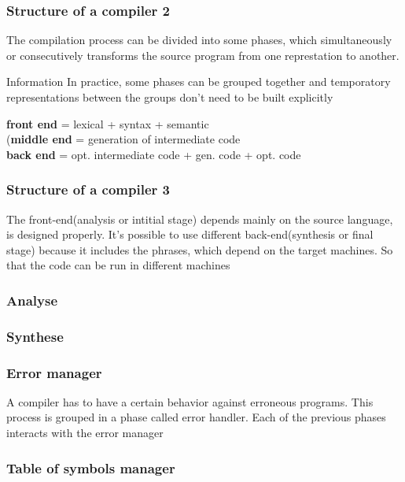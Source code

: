 \documentclass{beamer}
\begin{document}
\begin{frame}
\frametitle{Structure of a compiler 2}
The compilation process can be divided into some phases, which simultaneously or consecutively transforms the source program from one represtation to another.
\begin{block}{Information}
In practice, some phases can be grouped together and temporatory representations between the groups don't need to be built explicitly
\end{block}
\textbf{front end }= lexical + syntax + semantic\\
(\textbf{middle end} = generation of intermediate code\\
\textbf{back end} = opt. intermediate code + gen. code + opt. code\\
\end{frame}


\begin{frame}
\frametitle{Structure of a compiler 3}
The front-end(analysis or intitial stage) depends mainly on the source language, is designed properly. It's possible to use different back-end(synthesis or final stage) because it includes the phrases, which depend on the target machines. So that the code can be run in different machines
\end{frame}


\begin{frame}
\frametitle{Analyse}
\end{frame}
\begin{frame}
\frametitle{Synthese}
\end{frame}
\begin{frame}
\frametitle{Error manager}
A compiler has to have a certain behavior against erroneous programs. This process is grouped in a phase called error handler. Each of the previous phases interacts with the error manager
\end{frame}
\begin{frame}
\frametitle{Table of symbols manager}
\end{frame}
\end{document}

